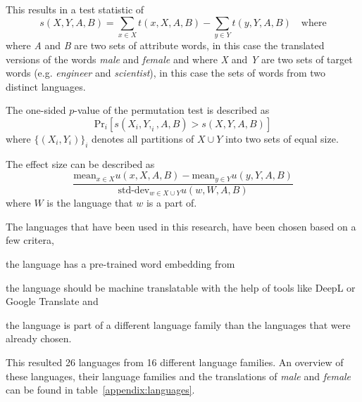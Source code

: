 This results in a test statistic of
$$
s(X,Y,A,B) = \displaystyle\sum_{x \in X}t(x,X,A,B) - \displaystyle\sum_{y \in Y}t(y,Y,A,B)\quad\text{where}
$$
where \textit{A} and \textit{B} are two sets of attribute words, in this case the
translated versions of the words \textit{male} and
\textit{female} and where \textit{X} and \textit{Y} are two sets of target words
(e.g. \textit{engineer} and \textit{scientist}), in this case the sets of words from
two distinct languages. 

The one-sided $p$-value of the permutation test is described as
$$
\text{Pr}_i[s(X_i, Y,_i, A, B) > s(X,Y,A,B)]
$$
where $\{(X_i, Y_i)\}_i$ denotes all partitions of $X \cup Y$ into two sets of equal 
size.

The effect size can be described as
$$
\frac{
    \text{mean}_{x \in X} u(x, X, A, B) - \text{mean}_{y \in Y} u(y, Y, A, B)
}{
    \text{std-dev}_{w \in X \cup Y} u(w,W,A,B)
}
$$
where $W$ is the language that $w$ is a part of.


The languages that have been used in this research, have been chosen based on a
few critera,
\begin{seriate}
    \item the language has a pre-trained word embedding from \textcite{grave2018learning}
    \item the language should be machine translatable with the help of tools like DeepL or
    Google Translate and
    \item the language is part of a different language family than the languages that
    were already chosen.
\end{seriate}
This resulted 26 languages from 16 different language families. An overview of these languages, their language families and the translations of \textit{male} and \textit{female}
can be found in table~\ref{appendix:languages}.

